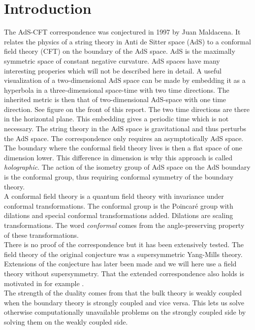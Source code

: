 \documentclass[12pt]{report}
\begin{document}
\chapter{Introduction}
The AdS-CFT correspondence was conjectured in 1997 by Juan Maldacena. It relates the physics of a string theory in Anti de Sitter space (AdS) to a conformal field theory (CFT) on the boundary of the AdS space. AdS is the maximally symmetric space of constant negative curvature. AdS spaces have many interesting properies which will not be described here in detail. A useful visualization of a two-dimensional AdS space can be made by embedding it as a hyperbola in a three-dimensional space-time with two time directions. The inherited metric is then that of two-dimensional AdS-space with one time direction. See figure on the front of this report. The two time directions are there in the horizontal plane. This embedding gives a periodic time which is not necessary. The string theory in the AdS space is gravitational and thus perturbs the AdS space. The correspondence only requires an asymptotically AdS space. The boundary where the conformal field theory lives is then a flat space of one dimension lower. This difference in dimension is why this approach is called \emph{holographic}. The action of the isometry group of AdS space on the AdS boundary is the conformal group, thus requiring conformal symmetry of the boundary theory.\\
A conformal field theory is a quantum field theory with invariance under conformal transformations. The conformal group is the Poincar\'{e} group with dilations and special conformal transformations added. Dilations are scaling transformations. The word \emph{conformal} comes from the angle-preserving property of these transformations.\\

There is no proof of the correspondence but it has been extensively tested. The field theory of the original conjecture\cite{Maldacena:1997re} was a supersymmetric Yang-Mills theory. Extensions of the conjecture has later been made and we will here use a field theory without supersymmetry. That the extended correspondence also holds is motivated in for example \cite{McGreevy:2009xe}.\\

The strength of the duality comes from that the bulk theory is weakly coupled when the boundary theory is strongly coupled and vice versa. This lets us solve otherwise computationally unavailable problems on the strongly coupled side by solving them on the weakly coupled side.\\
\end{document}
